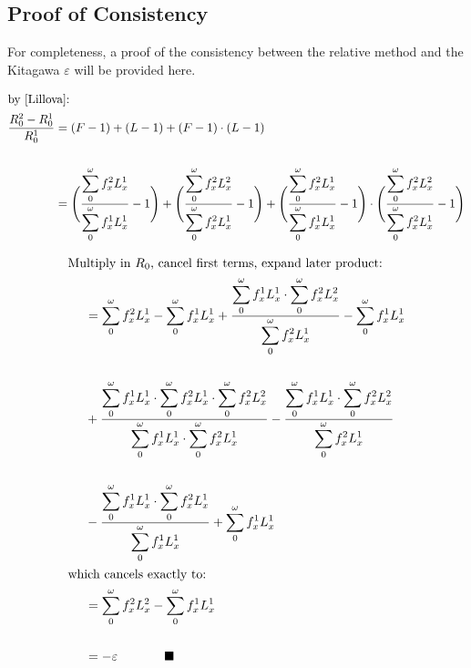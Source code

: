 \documentclass{article}
\begin{document}
\subsection{Proof of Consistency}
For completeness, a proof of the consistency between the \citet{lillova2008r0decomp} relative method and the Kitagawa $\varepsilon$ will be provided here.

\begin{align}
\intertext{by \eqref{Lillova}:}
\frac{R_{0}^{2}-R_{0}^{1}}{R_{0}^{1}} &= (F-1)+(L-1)+(F-1)\cdot(L-1) \notag \\ \notag \\
&= \Bigg(\frac{\displaystyle \sum_{0}^{\omega} f_{x}^{2}L_{x}^{1}}{\displaystyle \sum_{0}^{\omega}f_{x}^{1}L_{x}^{1}}-1 \Bigg)+\Bigg(\frac{\displaystyle \sum_{0}^{\omega} f_{x}^{2}L_{x}^{2}}{\displaystyle \sum_{0}^{\omega}f_{x}^{2}L_{x}^{1}}-1 \Bigg)+\Bigg(\frac{\displaystyle \sum_{0}^{\omega} f_{x}^{2}L_{x}^{1}}{\displaystyle \sum_{0}^{\omega}f_{x}^{1}L_{x}^{1}}-1 \Bigg)\cdot\Bigg(\frac{\displaystyle \sum_{0}^{\omega} f_{x}^{2}L_{x}^{2}}{\displaystyle \sum_{0}^{\omega}f_{x}^{2}L_{x}^{1}}-1 \Bigg) \notag 
\end{align}

\begin{align}
\intertext{Multiply in $R_{0}$, cancel first terms, expand later product:}
{~~~~}&= \sum_{0}^{\omega}f_{x}^{2}L_{x}^{1}-\sum_{0}^{\omega}f_{x}^{1}L_{x}^{1}+\frac{\displaystyle \sum_{0}^{\omega} f_{x}^{1}L_{x}^{1}\cdot \sum_{0}^{\omega} f_{x}^{2}L_{x}^{2}}{\displaystyle \sum_{0}^{\omega}f_{x}^{2}L_{x}^{1}} - \sum _{0}^{\omega}f_{x}^{1}L_{x}^{1}\notag \\ \notag \\
&  +  \frac{\displaystyle \sum_{0}^{\omega} f_{x}^{1}L_{x}^{1}\cdot\sum_{0}^{\omega} f_{x}^{2}L_{x}^{1} \cdot \sum_{0}^{\omega} f_{x}^{2}L_{x}^{2}}{\displaystyle \sum_{0}^{\omega} f_{x}^{1}L_{x}^{1}\cdot\sum_{0}^{\omega}f_{x}^{2}L_{x}^{1}} - \frac{\displaystyle \sum_{0}^{\omega} f_{x}^{1}L_{x}^{1}\cdot \sum_{0}^{\omega} f_{x}^{2}L_{x}^{2}}{\displaystyle \sum_{0}^{\omega}f_{x}^{2}L_{x}^{1}} \notag \\ \notag \\
& - \frac{\displaystyle \sum_{0}^{\omega} f_{x}^{1}L_{x}^{1}\cdot \sum_{0}^{\omega} f_{x}^{2}L_{x}^{1}}{\displaystyle \sum_{0}^{\omega}f_{x}^{1}L_{x}^{1}} + \sum_{0}^{\omega} f_{x}^{1}L_{x}^{1} \notag \\
\intertext{which cancels exactly to:}
& = \sum_{0}^{\omega}f_{x}^{2}L_{x}^{2} - \sum_{0}^{\omega}f_{x}^{1}L_{x}^{1} \notag \\ \notag \\
& = -\varepsilon {~~~~~~~~~~~}\blacksquare\notag
\end{align}
\end{document}
